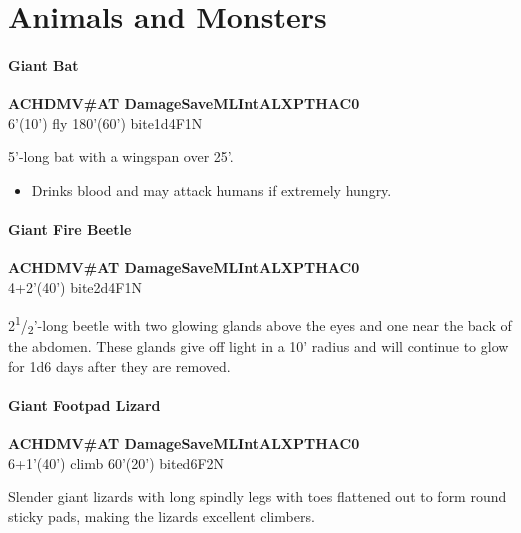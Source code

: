 \documentclass[english,11pt,openany,letterpaper,twocolumn]{book}
\newcommand{\half}{\textsuperscript{1}/\textsubscript{2}}
\begin{document}
\newcommand{\headerAnimal}{%
	\textbf{AC\tab HD\tab MV\tab \#AT \tab Damage\tab Save\tab ML\tab Int\tab AL\tab XP\tab THAC0}\\%
}

\skipline
\section{Animals and Monsters}

%

\hypertarget{bat}{}
\paragraph{Giant Bat}
\headerAnimal
6'(10') fly 180'(60') bite\tab 1d4\tab F1\tab N

5'-long bat with a wingspan over 25'.
\begin{itemize}[leftmargin=*,label=\itshape\textbullet]
\item
Drinks blood and may attack humans if extremely hungry.
\end{itemize}


\skipline\skipline
\hypertarget{beetle}{}
\paragraph{Giant Fire Beetle}
\headerAnimal
4+2'(40') bite\tab 2d4\tab F1\tab N

2\half'-long beetle with two glowing glands above the eyes and one near the back of the abdomen. These glands give off light in a 10' radius and will continue to glow for 1d6 days after they are removed.


\skipline\skipline
\hypertarget{lizard}{}
\paragraph{Giant Footpad Lizard}
\headerAnimal
6+1'(40') climb 60'(20')  bite\tab d6\tab F2\tab N

Slender giant lizards with long spindly legs with toes flattened out to form round sticky pads, making the lizards excellent climbers.

\setAnimalTabPositions{}
\end{document}

